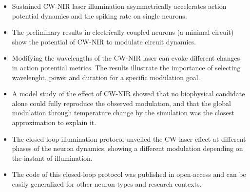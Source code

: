 \begin{itemize}
     \begin{itemize}
         \item Sustained CW-NIR laser illumination asymmetrically accelerates action potential dynamics and the spiking rate on single neurons.
         \item The preliminary results in electrically coupled neurons (a minimal circuit) show the potential of CW-NIR to modulate circuit dynamics.
         \item    Modifying the wavelengths of the CW-NIR laser can evoke different changes in action potential metrics. The results illustrate the importance of selecting  wavelenght, power and duration for a specific modulation goal.
         \item A model study of the effect of CW-NIR showed that no biophysical candidate alone could fully reproduce the observed modulation,  and that the global modulation through temperature change by the simulation was the closest approximation to explain it.
         \item The closed-loop illumination protocol unveiled the CW-laser effect at different phases of the neuron dynamics, showing a different modulation depending on the instant of illumination.
         \item The code of this closed-loop protocol was published in open-access and can be easily generalized for other neuron types and research contexts.
     \end{itemize}
\end{itemize}
